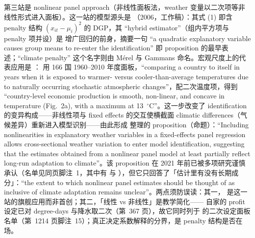 第三站是 nonlinear panel approach（非线性面板法，weather 变量以二次项等非线性形式进入面板）。这一站的模型源头是 \citet{mcintosh2006identifying}（2006，工作稿）：其式 (1) 即含 penalty 结构 $(x_{it}-\mu_i)^2$ 的 DGP，其 ``hybrid estimator''（组内平方项与 penalty 项并设）是  增广回归的前身，摘要一句 ``a quadratic explanatory variable causes group means to re-enter the identification''\citep[第~1、4、6--7 页]{mcintosh2006identifying} 即 proposition 的最早表述；``climate penalty'' 这个名字则由 Mérel 与 Gammans 命名\citep[第~1213 页]{merel2021climate}。宏观尺度上的代表应用是 ：\citet{burke2015global} 用 166 国 1960--2010 年度面板，``comparing a country to itself in years when it is exposed to warmer- versus cooler-than-average temperatures due to naturally occurring stochastic atmospheric changes''\citep[第~236 页]{burke2015global}，配二次温度项，得到 ``country-level economic production is smooth, non-linear, and concave in temperature (Fig.~2a), with a maximum at 13~$^\circ$C''\citep[第~236 页]{burke2015global}。这一步改变了 identification 的变异构成——非线性项与 fixed effects 的交互使横截面 climatic differences（气候差异）重新进入模型识别——由此形成 \citet{merel2021climate} 整理的 proposition（命题）：``Including nonlinearities in explanatory weather variables in a fixed-effects panel regression allows cross-sectional weather variation to enter model identification, suggesting that the estimates obtained from a nonlinear panel model at least partially reflect long-run adaptation to climate''\citep[第~1208 页]{merel2021climate}。该 proposition 在 2021 年前已被多项研究谨慎承认（名单见同页脚注~1，其中有 \citealp{mcintosh2006identifying} 与 \citealp{burke2015global}），但它只回答了「估计里有没有长期成分」：``the extent to which nonlinear panel estimates should be thought of as inclusive of climate adaptation remains unclear''\citep[第~1208 页]{merel2021climate}。两点须防误读：其一，\citet{burke2015global} 是这一站的旗舰应用而非首创；其二，「线性 vs 非线性」是教学简化——\citet{deschenes2007economic} 自家的 profit 设定已对 degree-days 与降水取二次（第~367 页），故它同时列于 \citet{merel2021climate} 的二次设定面板名单（第~1214 页脚注~15）；真正决定系数解释的分界，是 penalty 结构是否在场。

